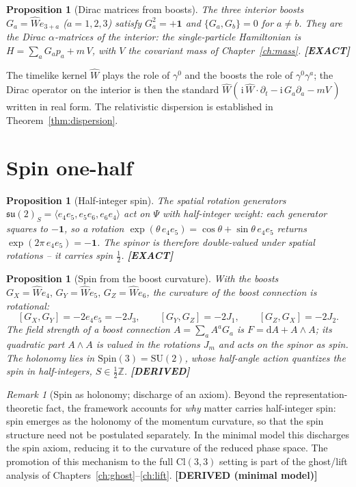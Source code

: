 \documentclass[11pt,oneside]{book}
\newcommand{\Wh}{\hat{W}}                         %
\newcommand{\Cl}{\mathrm{Cl}}                     %
\newcommand{\dd}{\mathrm{d}}
\newcommand{\su}{\mathfrak{su}}
\newcommand{\Spin}{\mathrm{Spin}}
\newcommand{\status}[1]{{\sffamily\bfseries\color{statuscol}[#1]}}
\theoremstyle{plain}
\newtheorem{proposition}[theorem]{Proposition}
\theoremstyle{definition}
\theoremstyle{remark}
\newtheorem{remark}[theorem]{Remark}
\begin{document}
\begin{proposition}[Dirac matrices from boosts]
\label{prop:dirac-matrices}
The three interior boosts $G_a=\Wh e_{3+a}$ ($a=1,2,3$) satisfy $G_a^2=+\mathbf 1$
and $\{G_a,G_b\}=0$ for $a\neq b$. They are the Dirac $\alpha$-matrices of the
interior: the single-particle Hamiltonian is $H=\sum_a G_a p_a+m\,V$, with $V$ the
covariant mass of Chapter~\ref{ch:mass}. \status{EXACT}
\end{proposition}

The timelike kernel $\Wh$ plays the role of $\gamma^0$ and the boosts the role of
$\gamma^0\gamma^a$; the Dirac operator on the interior is then the standard
$\Wh(\,\mathrm i\,\Wh\!\cdot\!\partial_t-\mathrm i\,G_a\partial_a-mV\,)$ written in
real form. The relativistic dispersion is established in
Theorem~\ref{thm:dispersion}.

\section{Spin one-half}
\label{sec:spin}

\begin{proposition}[Half-integer spin]
\label{prop:spin}
The spatial rotation generators $\su(2)_S=\langle e_4e_5,e_5e_6,e_6e_4\rangle$ act
on $\Psi$ with half-integer weight: each generator squares to $-\mathbf 1$, so a
rotation $\exp(\theta\,e_4e_5)=\cos\theta+\sin\theta\,e_4e_5$ returns
$\exp(2\pi\,e_4e_5)=-\mathbf 1$. The spinor is therefore double-valued under
spatial rotations -- it carries spin $\tfrac12$. \status{EXACT}
\end{proposition}

\begin{proposition}[Spin from the boost curvature]
\label{prop:spin-curvature}
With the boosts $G_X=\Wh e_4,\,G_Y=\Wh e_5,\,G_Z=\Wh e_6$, the curvature of the
boost connection is rotational:
\[
  [G_X,G_Y]=-2e_4e_5=-2J_3,\qquad
  [G_Y,G_Z]=-2J_1,\qquad [G_Z,G_X]=-2J_2.
\]
The field strength of a boost connection $A=\sum_aA^aG_a$ is $F=\dd A+A\wedge A$; its
quadratic part $A\wedge A$ is valued in the rotations $J_m$ and acts on the spinor as
spin. The holonomy lies in $\Spin(3)=\mathrm{SU}(2)$, whose half-angle action
quantizes the spin in half-integers, $S\in\tfrac12\mathbb Z$. \status{DERIVED}
\end{proposition}

\begin{remark}[Spin as holonomy; discharge of an axiom]
\label{rem:spin-holonomy}
Beyond the representation-theoretic fact, the framework accounts for \emph{why}
matter carries half-integer spin: spin emerges as the holonomy of the momentum
curvature, so that the spin structure need not be postulated separately. In the
minimal model this discharges the spin axiom,
reducing it to the curvature of the reduced phase space. The promotion of this
mechanism to the full $\Cl(3,3)$ setting is part of the ghost/lift analysis of
Chapters~\ref{ch:ghost}--\ref{ch:lift}. \status{DERIVED (minimal model)}
\end{remark}
\end{document}
